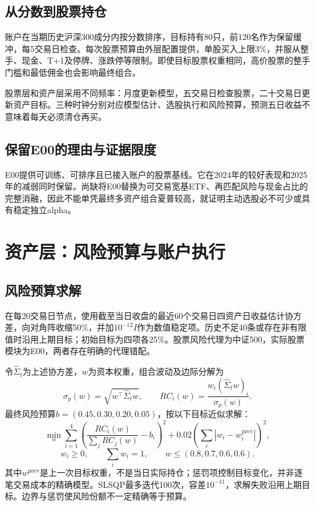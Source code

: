 \documentclass[11pt,a4paper]{article}
\begin{document}
\subsection{从分数到股票持仓}
账户在当期历史沪深300成分内按分数排序，目标持有80只，前120名作为保留缓冲，每5交易日检查。每次股票预算由外层配置提供，单股买入上限3\%，并服从整手、现金、T+1及停牌、涨跌停等限制。即使目标股票权重相同，高价股票的整手门槛和最低佣金也会影响最终组合。

股票层和资产层采用不同频率：月度更新模型，五交易日检查股票，二十交易日更新资产目标。三种时钟分别对应模型估计、选股执行和风险预算，预测五日收益不意味着每天必须清仓再买。

\subsection{保留E00的理由与证据限度}
E00提供可训练、可排序且已接入账户的股票基线。它在2024年的较好表现和2025年的减弱同时保留。尚缺将E00替换为可交易宽基ETF、再匹配风险与现金占比的完整消融，因此不能单凭最终多资产组合夏普较高，就证明主动选股必不可少或具有稳定独立alpha。

\clearpage
\section{资产层：风险预算与账户执行}
\subsection{风险预算求解}
在每20交易日节点，使用截至当日收盘的最近60个交易日四资产日收益估计协方差，向对角阵收缩50\%，并加$10^{-12}I$作为数值稳定项。历史不足40条或存在非有限值时沿用上期目标；初始目标为四项各25\%。股票风险代理为中证500，实际股票模块为E00，两者存在明确的代理错配。

令$\widehat\Sigma_t$为上述协方差，$w$为资本权重，组合波动及边际分解为
\begin{equation}
 \sigma_p(w)=\sqrt{w^\top\widehat\Sigma_t w},\qquad
 RC_i(w)=\frac{w_i(\widehat\Sigma_t w)_i}{\sigma_p(w)}.
\end{equation}
最终风险预算$b=(0.45,0.30,0.20,0.05)$，按以下目标近似求解：
\begin{equation}\label{eq:opt}
 \min_w\sum_{i=1}^{4}\left(\frac{RC_i(w)}{\sum_j RC_j(w)}-b_i\right)^2
 +0.02\left(\sum_i|w_i-w^{\mathrm{prev}}_i|\right)^2,
\end{equation}
\begin{equation}
 w_i\geq0,\qquad \sum_iw_i=1,\qquad
 w\leq(0.8,0.7,0.6,0.6).
\end{equation}
其中$w^{\mathrm{prev}}$是上一次目标权重，不是当日实际持仓；惩罚项控制目标变化，并非逐笔交易成本的精确模型。SLSQP最多迭代100次，容差$10^{-11}$，求解失败沿用上期目标。边界与惩罚使风险份额不一定精确等于预算。
\end{document}
